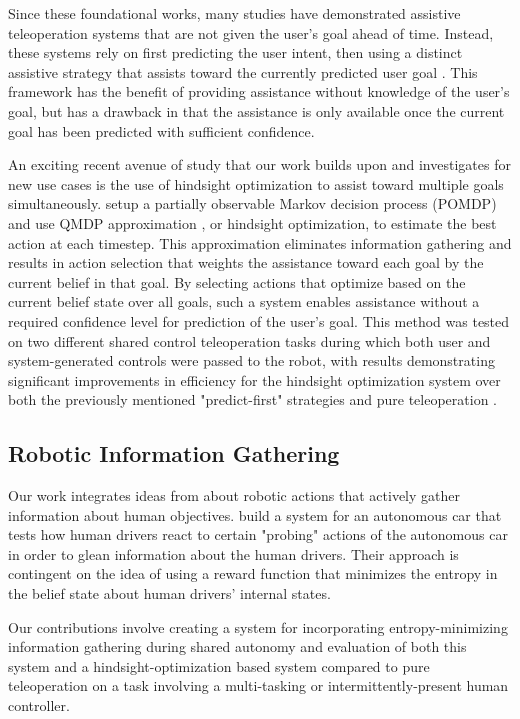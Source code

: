 \documentclass[conference]{IEEEtran}
\begin{document}
Since these foundational works, many studies have demonstrated assistive teleoperation systems that are not given the user's goal ahead of time. Instead, these systems rely on first predicting the user intent, then using a distinct assistive strategy that assists toward the currently predicted user goal \cite{dragan2012formalizing, fagg2004extracting, kragic2005human, schultz2017goal, yu2005telemanipulation}. This framework has the benefit of providing assistance without knowledge of the user's goal, but has a drawback in that the assistance is only available once the current goal has been predicted with sufficient confidence. 

An exciting recent avenue of study that our work builds upon and investigates for new use cases is the use of hindsight optimization to assist toward multiple goals simultaneously. \citet{javdani2015shared} setup a partially observable Markov decision process (POMDP) and use QMDP approximation \cite{littman1995learning}, or hindsight optimization, to estimate the best action at each timestep. This approximation eliminates information gathering and results in action selection that weights the assistance toward each goal by the current belief in that goal. By selecting actions that optimize based on the current belief state over all goals, such a system enables assistance without a required confidence level for prediction of the user's goal. This method was tested on two different shared control teleoperation tasks during which both user and system-generated controls were passed to the robot, with results demonstrating significant improvements in efficiency for the hindsight optimization system over both the previously mentioned "predict-first" strategies and pure teleoperation \cite{javdani2018shared}.

\subsection{Robotic Information Gathering}
Our work integrates ideas from \citet{sadigh2016information} about robotic actions that actively gather information about human objectives. \citet{sadigh2016information} build a system for an autonomous car that tests how human drivers react to certain "probing" actions of the autonomous car in order to glean information about the human drivers. Their approach is contingent on the idea of using a reward function that minimizes the entropy in the belief state about human drivers' internal states.

Our contributions involve creating a system for incorporating entropy-minimizing information gathering during shared autonomy and evaluation of both this system and a hindsight-optimization based system compared to pure teleoperation on a task involving a multi-tasking or intermittently-present human controller.
\end{document}
